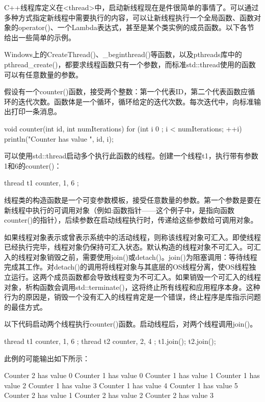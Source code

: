 
C++线程库定义在<thread>中，启动新线程现在是件很简单的事情了。可以通过多种方式指定新线程中需要执行的内容，可以让新线程执行一个全局函数、函数对象的operator()、一个Lambda表达式，甚至是某个类实例的成员函数。以下各节给出一些简单的示例。


Windows上的CreateThread()、\_beginthread()等函数，以及pthreads库中的pthread\_create()，都要求线程函数只有一个参数，而标准std::thread使用的函数可以有任意数量的参数。

假设有一个counter()函数，接受两个整数：第一个代表ID，第二个代表函数应循环的迭代次数。函数体是一个循环，循环给定的迭代次数。每次迭代中，向标准输出打印一条消息。

\begin{cpp}
void counter(int id, int numIterations)
{
    for (int i { 0 }; i < numIterations; ++i) {
        println("Counter {} has value {}", id, i);
    }
}
\end{cpp}

可以使用std::thread启动多个执行此函数的线程。创建一个线程t1，执行带有参数1和6的counter()：

\begin{cpp}
thread t1 { counter, 1, 6 };
\end{cpp}

线程类的构造函数是一个可变参数模板，接受任意数量的参数。第一个参数是要在新线程中执行的可调用对象（例如:函数指针——这个例子中，是指向函数counter()的指针），后续参数在启动线程执行时，传递给这些参数给可调用对象。

如果线程对象表示或曾表示系统中的活动线程，则称该线程对象可汇入。即使线程已经执行完毕，线程对象仍保持可汇入状态。默认构造的线程对象不可汇入。可汇入的线程对象销毁之前，需要使用join()或detach()。join()为阻塞调用：等待线程完成其工作。对detach()的调用将线程对象与其底层的OS线程分离，使OS线程独立运行。这两个成员函数都会导致线程变为不可汇入。如果销毁一个可汇入的线程对象，析构函数会调用std::terminate()，这将终止所有线程和应用程序本身。这种行为的原因是，销毁一个没有汇入的线程肯定是一个错误，终止程序是库指示问题的最佳方式。

以下代码启动两个线程执行counter()函数。启动线程后，对两个线程调用join()。

\begin{cpp}
thread t1 { counter, 1, 6 };
thread t2 { counter, 2, 4 };
t1.join();
t2.join();
\end{cpp}

此例的可能输出如下所示：

\begin{shell}
Counter 2 has value 0
Counter 1 has value 0
Counter 1 has value 1
Counter 1 has value 2
Counter 1 has value 3
Counter 1 has value 4
Counter 1 has value 5
Counter 2 has value 1
Counter 2 has value 2
Counter 2 has value 3
\end{shell}

